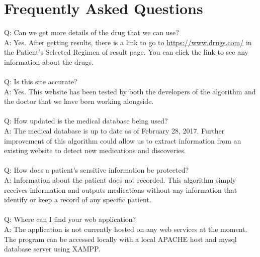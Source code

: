 \documentclass[12pt]{article}
\begin{document}
\section{Frequently Asked Questions}
Q: Can we get more details of the drug that we can use?\\
A: Yes. After getting results, there is a link to go to \url{https://www.drugs.com/} in the Patient’s Selected Regimen of result page. You can click the link to see any information about the drugs.\\\\
Q: Is this site accurate?\\
A: Yes. This website has been tested by both the developers of the algorithm and the doctor that we have been working alongside.\\\\
Q: How updated is the medical database being used?\\
A: The medical database is up to date as of February 28, 2017. Further improvement of this algorithm could allow us to extract information from an existing website to detect new medications and discoveries.\\\\
Q: How does a patient's sensitive information be protected?\\
A: Information about the patient does not recorded. This algorithm simply receives information and outputs medications without any information that identify or keep a record of any specific patient.\\\\
Q: Where can I find your web application?\\
A: The application is not currently hosted on any web services at the moment. The program can be accessed locally with a local APACHE host and mysql database server using XAMPP.
\end{document}
